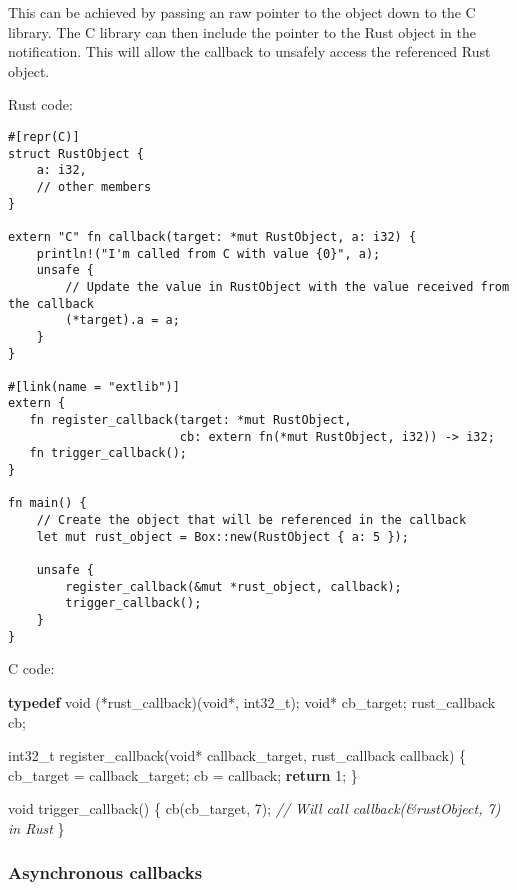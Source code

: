 \documentclass[a4paper,]{book}
\newenvironment{Shaded}{\begin{snugshade}}{\end{snugshade}}
\newcommand{\KeywordTok}[1]{\textcolor[rgb]{0.13,0.29,0.53}{\textbf{{#1}}}}
\newcommand{\DataTypeTok}[1]{\textcolor[rgb]{0.13,0.29,0.53}{{#1}}}
\newcommand{\DecValTok}[1]{\textcolor[rgb]{0.00,0.00,0.81}{{#1}}}
\newcommand{\CommentTok}[1]{\textcolor[rgb]{0.56,0.35,0.01}{\textit{{#1}}}}
\newcommand{\NormalTok}[1]{{#1}}
\begin{document}
This can be achieved by passing an raw pointer to the object down to the
C library. The C library can then include the pointer to the Rust object
in the notification. This will allow the callback to unsafely access the
referenced Rust object.

Rust code:

\begin{verbatim}
#[repr(C)]
struct RustObject {
    a: i32,
    // other members
}

extern "C" fn callback(target: *mut RustObject, a: i32) {
    println!("I'm called from C with value {0}", a);
    unsafe {
        // Update the value in RustObject with the value received from the callback
        (*target).a = a;
    }
}

#[link(name = "extlib")]
extern {
   fn register_callback(target: *mut RustObject,
                        cb: extern fn(*mut RustObject, i32)) -> i32;
   fn trigger_callback();
}

fn main() {
    // Create the object that will be referenced in the callback
    let mut rust_object = Box::new(RustObject { a: 5 });

    unsafe {
        register_callback(&mut *rust_object, callback);
        trigger_callback();
    }
}
\end{verbatim}

C code:

\begin{Shaded}
\begin{Highlighting}[]
\KeywordTok{typedef} \DataTypeTok{void} \NormalTok{(*rust_callback)(}\DataTypeTok{void}\NormalTok{*, }\DataTypeTok{int32_t}\NormalTok{);}
\DataTypeTok{void}\NormalTok{* cb_target;}
\NormalTok{rust_callback cb;}

\DataTypeTok{int32_t} \NormalTok{register_callback(}\DataTypeTok{void}\NormalTok{* callback_target, rust_callback callback) \{}
    \NormalTok{cb_target = callback_target;}
    \NormalTok{cb = callback;}
    \KeywordTok{return} \DecValTok{1}\NormalTok{;}
\NormalTok{\}}

\DataTypeTok{void} \NormalTok{trigger_callback() \{}
  \NormalTok{cb(cb_target, }\DecValTok{7}\NormalTok{); }\CommentTok{// Will call callback(&rustObject, 7) in Rust}
\NormalTok{\}}
\end{Highlighting}
\end{Shaded}

\subsubsection{Asynchronous callbacks}\label{asynchronous-callbacks}
\end{document}
